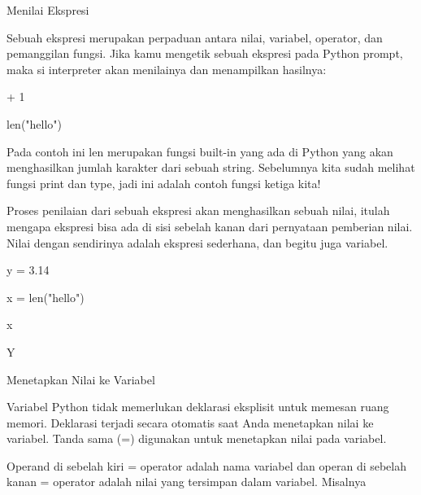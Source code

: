 \vspace{12pt}
\noindent 
Menilai Ekspresi \par
\vspace{12pt}
\noindent 
Sebuah ekspresi merupakan perpaduan antara nilai, variabel, operator, dan pemanggilan fungsi. 
Jika kamu mengetik sebuah ekspresi pada Python prompt, maka si interpreter akan $  $menilainya $  $dan menampilkan hasilnya: \par
\vspace{12pt}
 + 1 \par
{} \par
\noindent 
len("hello") \par
{} \par
\noindent 
Pada contoh ini $  $len $  $merupakan fungsi built-in yang ada di Python yang akan menghasilkan jumlah karakter dari sebuah string. Sebelumnya kita sudah melihat fungsi $  $print $  $dan $  $type, jadi ini adalah contoh fungsi ketiga kita! \par
\vspace{12pt}
\noindent 
Proses $  $penilaian dari sebuah ekspresi $  $akan menghasilkan sebuah nilai, itulah mengapa ekspresi bisa ada di sisi sebelah kanan dari pernyataan pemberian nilai. $  $Nilai $  $dengan sendirinya $  $adalah ekspresi $  $sederhana, $  $dan begitu juga $  $variabel. \par
\vspace{12pt}
 \par
{} \par
\noindent 
y = 3.14 \par
\noindent 
x = len("hello") \par
\noindent 
x \par
{} \par
\noindent 
Y \par
\vspace{12pt}
 \par
\vspace{12pt}
\noindent 
Menetapkan Nilai ke Variabel \par
\vspace{12pt}
\noindent 
Variabel Python tidak memerlukan deklarasi eksplisit untuk memesan ruang memori. $  $Deklarasi terjadi secara otomatis saat Anda menetapkan nilai ke variabel. $  $Tanda sama (=) digunakan untuk menetapkan nilai pada variabel. \par
\vspace{12pt}
\noindent 
Operand di sebelah kiri = operator adalah nama variabel dan operan di sebelah kanan = operator adalah nilai yang tersimpan dalam variabel. $  $Misalnya  \par
